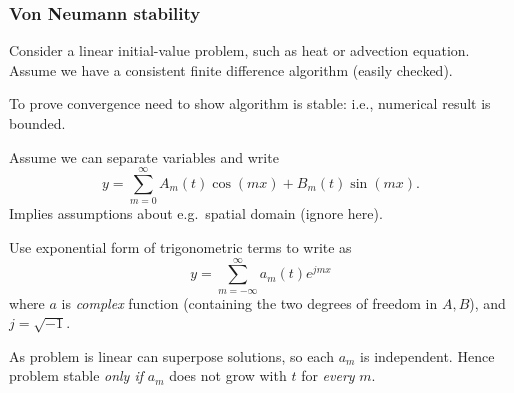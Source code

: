 \documentclass{beamer}
\begin{document}
\begin{frame}
  \frametitle{Von Neumann stability}

  \begin{overlayarea}{\textwidth}{0.8\textheight}
    {
      Consider a linear initial-value problem, such as heat or
      advection equation.  Assume we have a consistent finite
      difference algorithm (easily checked).
    }
    {

      \vspace{1ex}

      To prove convergence need to show algorithm is
      stable: i.e., numerical result is bounded.
    }
    {
      Assume we can separate variables and write
      \begin{equation*}
        y = \sum_{m = 0}^{\infty} A_{m}(t) \cos (m x) +
        B_{m}(t) \sin (m x). 
      \end{equation*}    
    }
    {
      Implies assumptions about e.g.\ spatial domain (ignore here).
    }
    {

      \vspace{1ex}

      Use exponential form of trigonometric terms to
      write as
      \begin{equation*}
        y = \sum_{m = -\infty}^{\infty} a_{m}(t) e^{j m x}
      \end{equation*}
      where $a$ is \emph{complex} function (containing the
      two degrees of freedom in $A,B$), and $j = \sqrt{-1}$.
    }
    {

      \vspace{1ex}

      As problem is linear can superpose solutions, so each
      $a_{m}$ is independent. Hence problem stable \emph{only
        if} $a_{m}$ does not grow with $t$ for \emph{every}
      $m$.  }
  \end{overlayarea}

\end{frame}
\end{document}
